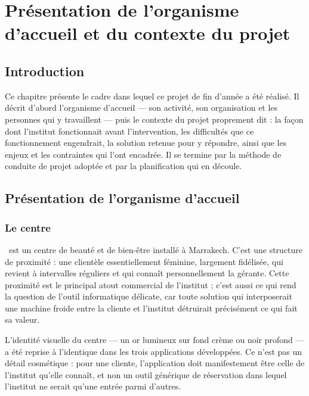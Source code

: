 \chapter{Présentation de l'organisme d'accueil et du contexte du projet}

\section*{Introduction}

Ce chapitre présente le cadre dans lequel ce projet de fin d'année a été
réalisé. Il décrit d'abord l'organisme d'accueil --- son activité, son
organisation et les personnes qui y travaillent --- puis le contexte du projet
proprement dit : la façon dont l'institut fonctionnait avant l'intervention,
les difficultés que ce fonctionnement engendrait, la solution retenue pour y
répondre, ainsi que les enjeux et les contraintes qui l'ont encadrée. Il se
termine par la méthode de conduite de projet adoptée et par la planification
qui en découle.

\section{Présentation de l'organisme d'accueil}

\subsection{Le centre \yani}

\yani\ est un centre de beauté et de bien-être installé à Marrakech. C'est une
structure de proximité : une clientèle essentiellement féminine, largement
fidélisée, qui revient à intervalles réguliers et qui connaît personnellement
la gérante. Cette proximité est le principal atout commercial de l'institut ;
c'est aussi ce qui rend la question de l'outil informatique délicate, car toute
solution qui interposerait une machine froide entre la cliente et l'institut
détruirait précisément ce qui fait sa valeur.


L'identité visuelle du centre --- un or lumineux sur fond crème ou noir profond
--- a été reprise à l'identique dans les trois applications développées. Ce
n'est pas un détail cosmétique : pour une cliente, l'application doit
manifestement être celle de l'institut qu'elle connaît, et non un outil
générique de réservation dans lequel l'institut ne serait qu'une entrée parmi
d'autres.

